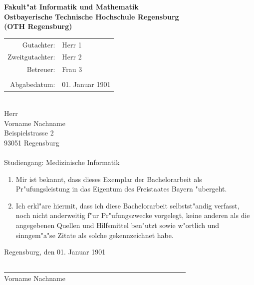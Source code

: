 \begin{titlepage}
\begin{center}
\vfill
\vfill
\textbf{\large Fakult"at Informatik und Mathematik\\
Ostbayerische Technische Hochschule Regensburg\\
(OTH Regensburg)}
\vfill
\vfill

\begin{tabular}{rl}
Gutachter:   & Herr 1\\
Zweitgutachter:   & Herr 2\\
Betreuer:   & Frau 3\\
\\Abgabedatum:& 01. Januar 1901
\end{tabular}
\end{center}
\end{titlepage}


%
%
\text{ }
\vspace{7cm}
\\
Herr\\
Vorname Nachname\\
Beispielstrasse 2\\
93051 Regensburg\\\\
Studiengang: Medizinische Informatik\\

\begin{enumerate}
\item Mir ist bekannt, dass dieses Exemplar der Bachelorarbeit als Pr"ufungsleistung in das Eigentum des Freistaates Bayern "ubergeht.
\item Ich erkl"are hiermit, dass ich diese Bachelorarbeit selbstst"andig verfasst, noch nicht anderweitig f"ur Pr"ufungszwecke vorgelegt, keine anderen als die angegebenen Quellen und Hilfsmittel ben"utzt sowie w"ortlich und sinngem"a"se Zitate als solche gekennzeichnet habe.
\end{enumerate}
\vspace{1cm}
Regensburg, den 01. Januar 1901\\
\medskip
\medskip

\underline{~~~~~~~~~~~~~~~~~~~~~~~~~~~~~~~~~~~~~~~~~~~~~~~~~~~~}\\
Vorname Nachname\\

